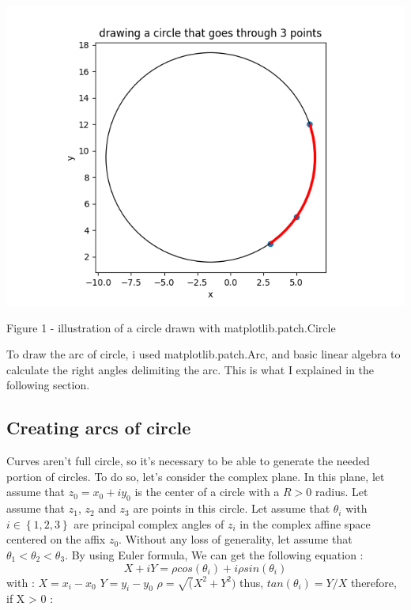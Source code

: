 \documentclass[a4paper,12pt,fleqn]{article}
\begin{document}
\includegraphics{test}

\begin{center}
Figure 1 - illustration of a circle drawn with matplotlib.patch.Circle
\end{center}


To draw the arc of circle, i used matplotlib.patch.Arc, and basic linear algebra to calculate the right angles delimiting the arc. This is what I explained in the following section.




\subsection{Creating arcs of circle}
Curves aren't full circle, so it's necessary to be able to generate the needed portion of circles. To do so, let's consider the complex plane. In this plane, let assume that \mbox{$z_0 = x_0 + iy_0$} is the center of a circle with a \mbox{$R > 0$} radius. Let assume that \mbox{$z_1$}, \mbox{$z_2$} and \mbox{$z_3$} are points in this circle.  Let assume that \mbox{$\theta_i$} with \mbox{$i \in \left\{1,2,3\right\}$}  are principal complex angles of  \mbox{$z_i$} in the complex affine space centered on the affix \mbox{$z_0$}. Without any loss of generality, let assume that \mbox{$\theta_1 < \theta_2 < \theta_3$}. By using Euler formula, We can get the following equation : 
\[X + iY =  \rho cos(\theta_i) + i\rho sin(\theta_i)\]
with :
\newline
\mbox{$X = x_i - x_0$}
\newline
\mbox{$Y = y_i - y_0$}
\newline
\mbox{$\rho = \sqrt(X^2 + Y^2)$}
\newline
\newline
thus, \mbox{$tan(\theta_i) = Y/X$}
\newline
\newline
therefore, if X > 0 : 
\end{document}
